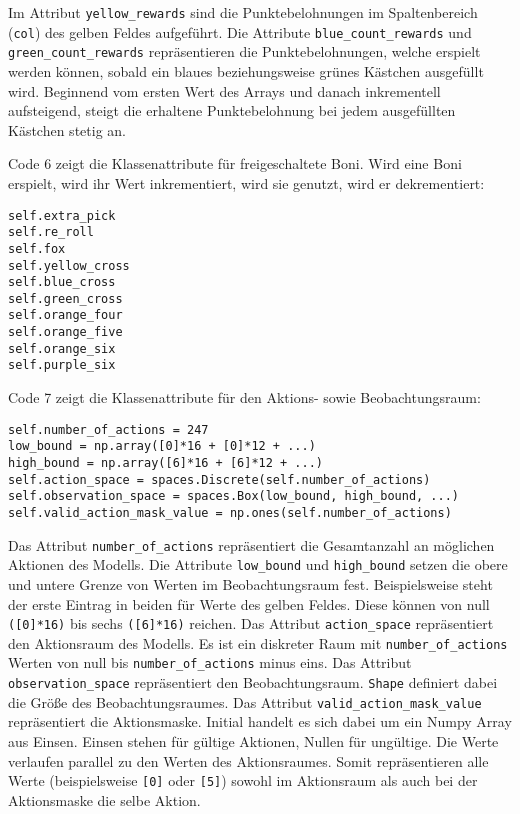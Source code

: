 Im Attribut \texttt{yellow\_rewards} sind die Punktebelohnungen im Spaltenbereich (\texttt{col}) des gelben Feldes aufgeführt. Die Attribute \texttt{blue\_count\_rewards} und \texttt{green\_count\_rewards} repräsentieren die Punktebelohnungen, welche erspielt werden können, sobald ein blaues beziehungsweise grünes Kästchen ausgefüllt wird. Beginnend vom ersten Wert des Arrays und danach inkrementell aufsteigend, steigt die erhaltene Punktebelohnung bei jedem ausgefüllten Kästchen stetig an.\\

\begin{minipage}{\linewidth}
Code 6 zeigt die Klassenattribute für freigeschaltete Boni. Wird eine Boni erspielt, wird ihr Wert inkrementiert, wird sie genutzt, wird er dekrementiert:
\vspace{0.5cm}
\begin{lstlisting}[caption={Klassenattribute für freigespielte Boni}, basicstyle=\ttfamily]
self.extra_pick
self.re_roll
self.fox
self.yellow_cross
self.blue_cross
self.green_cross
self.orange_four
self.orange_five
self.orange_six
self.purple_six
\end{lstlisting}
\end{minipage}

\begin{minipage}{\linewidth}
Code 7 zeigt die Klassenattribute für den Aktions- sowie Beobachtungsraum:
\vspace{0.5cm}
\begin{lstlisting}[caption={Klassenattribute des Aktions- und Beobachtungsraumes}, basicstyle=\ttfamily]
self.number_of_actions = 247
low_bound = np.array([0]*16 + [0]*12 + ...)
high_bound = np.array([6]*16 + [6]*12 + ...)
self.action_space = spaces.Discrete(self.number_of_actions)
self.observation_space = spaces.Box(low_bound, high_bound, ...)
self.valid_action_mask_value = np.ones(self.number_of_actions)
\end{lstlisting}
\end{minipage}

Das Attribut \texttt{number\_of\_actions} repräsentiert die Gesamtanzahl an möglichen Aktionen des Modells. Die Attribute \texttt{low\_bound} und \texttt{high\_bound} setzen die obere und untere Grenze von Werten im Beobachtungsraum fest. Beispielsweise steht der erste Eintrag in beiden für Werte des gelben Feldes. Diese können von null \texttt{([0]*16)} bis sechs \texttt{([6]*16)} reichen. Das Attribut \texttt{action\_space} repräsentiert den Aktionsraum des Modells. Es ist ein diskreter Raum mit \texttt{number\_of\_actions} Werten von null bis \texttt{number\_of\_actions} minus eins. Das Attribut \texttt{observation\_space} repräsentiert den Beobachtungsraum. \texttt{Shape} definiert dabei die Größe des Beobachtungsraumes. Das Attribut \texttt{valid\_action\_mask\_value} repräsentiert die Aktionsmaske. Initial handelt es sich dabei um ein Numpy Array aus Einsen. Einsen stehen für gültige Aktionen, Nullen für ungültige. Die Werte verlaufen parallel zu den Werten des Aktionsraumes. Somit repräsentieren alle Werte (beispielsweise \texttt{[0]} oder \texttt{[5]}) sowohl im Aktionsraum als auch bei der Aktionsmaske die selbe Aktion.\\


